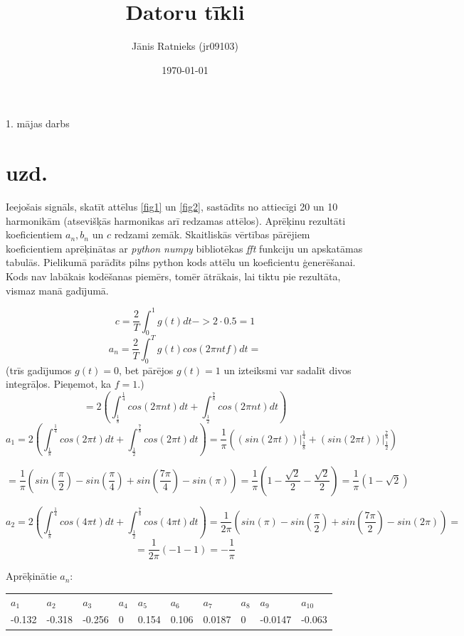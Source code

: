 \documentclass[a4paper,11pt]{article}
\begin{document}
\author{Jānis Ratnieks (jr09103)}
\title{Datoru tīkli }

\date{\today}

\maketitle
\begin{center}
1. mājas darbs
\end{center}






\section{ uzd.}

Ieejošais signāls, skatīt attēlus \ref{fig1} un \ref{fig2}, sastādīts no attiecīgi 20 un 10 harmonikām (atsevišķās harmonikas arī redzamas attēlos). Aprēķinu rezultāti koeficientiem $a_n, b_n$ un $c$ redzami zemāk. Skaitliskās vērtības pārējiem koeficientiem aprēķinātas ar \textit{python numpy} bibliotēkas \textit{fft} funkciju un apskatāmas tabulās. Pielikumā parādīts pilns python kods attēlu un koeficientu ģenerēšanai. Kods nav labākais kodēšanas piemērs, tomēr ātrākais, lai tiktu pie rezultāta, vismaz manā gadījumā.

$$c=\frac{2}{T}\int_{0}^{1}g(t)dt -> 2\cdot 0.5=1$$
$$a_{n}=\frac{2}{T}\int_{0}^{T}g(t)cos(2 \pi ntf)dt =$$
(trīs gadījumos $g(t)=0$, bet pārējos $g(t)=1$ un izteiksmi var sadalīt divos integrāļos. Pieņemot, ka $f=1$.)
$$= 2(\int_{\frac{1}{8}}^{\frac{1}{4}}cos(2\pi nt)dt+\int_{\frac{1}{2}}^{\frac{7}{8}}cos(2\pi nt)dt)$$
$$a_1= 2(\int_{\frac{1}{8}}^{\frac{1}{4}}cos(2\pi t)dt+\int_{\frac{1}{2}}^{\frac{7}{8}}cos(2\pi t)dt)=\frac{1}{\pi}(\left.(sin(2\pi t))\right\vert_{\frac{1}{8}}^\frac{1}{4}+\left.(sin(2\pi t))\right\vert_{\frac{1}{2}}^\frac{7}{8})$$


$$=\frac{1}{\pi}(sin(\frac{\pi}{2})-sin(\frac{\pi}{4})+sin(\frac{7\pi}{4})-sin(\pi))=\frac{1}{\pi}(1-\frac{\sqrt{2}}{2}-\frac{\sqrt{2}}{2})=\frac{1}{\pi}(1-\sqrt{2})$$

$$a_2= 2(\int_{\frac{1}{8}}^{\frac{1}{4}}cos(4\pi t)dt+\int_{\frac{1}{2}}^{\frac{7}{8}}cos(4\pi t)dt)=\frac{1}{2\pi}(sin(\pi)-sin(\frac{\pi}{2})+sin(\frac{7\pi}{2})-sin(2\pi))=$$
$$=\frac{1}{2\pi}(-1-1)=-\frac{1}{\pi}$$

Aprēķinātie $a_n$:
\begin{table}[]
\begin{tabular}{|l|l|l|l|l|l|l|l|l|l|}
\cline{1-10}
$a_1$ &$a_{2}$  &$a_3$  &$a_4$  &$a_5$  &$a_6$  &$a_7$  &$a_8$  &$a_9$  &$a_{10}$  \\ \cline{1-10}
 -0.132 & -0.318 & -0.256 & 0 & 0.154 & 0.106 & 0.0187 & 0 & -0.0147 & -0.063 \\ \cline{1-10}
\end{tabular}
\end{table}
\end{document}
